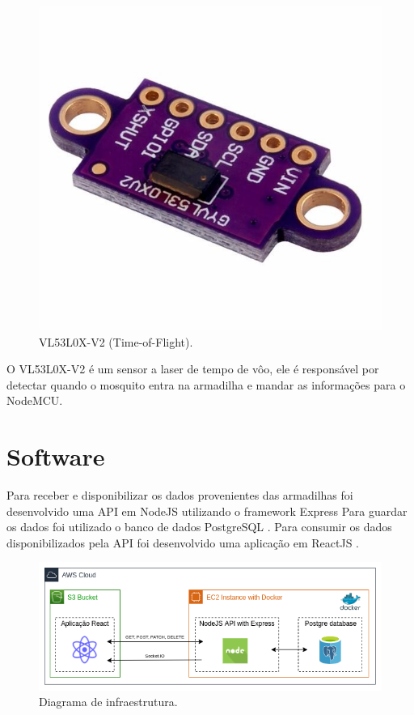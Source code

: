 \documentclass[
	12pt,				%
	openright,			%
	oneside,			%
	a4paper,			%
	chapter=TITLE,		%
	english,			%
	brazil				%
	]{abntex2}
\begin{document}
\begin{figure}[H]
\centering
\includegraphics[scale=0.1]{imagens/gy-vl53l0x.jpg}
\caption{VL53L0X-V2 (Time-of-Flight).}
    \label{fig:gy-vl53l0x}
\end{figure}

O VL53L0X-V2 é um sensor a laser de tempo de vôo, ele é responsável por detectar quando o mosquito entra na armadilha e mandar as 
informações para o NodeMCU.

\section{Software}

Para receber e disponibilizar os dados provenientes das armadilhas foi desenvolvido uma API em NodeJS \cite{NodeJS} utilizando o framework Express \cite{Express}
Para guardar os dados foi utilizado o banco de dados PostgreSQL \cite{PostgreSQL}. Para consumir os dados disponibilizados pela API foi desenvolvido uma aplicação
em ReactJS \cite{React}.

\begin{figure}[H]
\centering
\includegraphics[scale=0.6]{imagens/diagramacloud.png}
\caption{Diagrama de infraestrutura.}
    \label{fig:cloud}
\end{figure}
\end{document}
